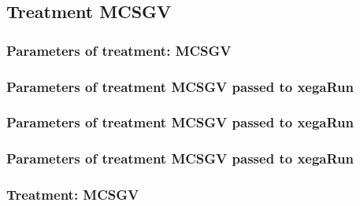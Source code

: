\documentclass[18pt,c]{beamer}
\makeatletter
\def\beamer@writeslidentry@miniframesoff{%
  \expandafter\beamer@ifempty\expandafter{\beamer@framestartpage}{}%
  {%
   \clearpage\beamer@notesactions%
  }
}
\newcommand*{\miniframesoff}{\let\beamer@writeslidentry=\beamer@writeslidentry@miniframesoff}
\makeatother
\begin{document}
\miniframesoff
\subsection{Treatment MCSGV}

 \begin{frame}
 \fontsize{8pt}{9pt}\selectfont
 \frametitle{  Parameters of treatment: MCSGV 
 }

 \label{ExpAtParmTable008.tex}  
 \end{frame}


 \begin{frame}
 \fontsize{8pt}{9pt}\selectfont
 \frametitle{  Parameters of treatment MCSGV passed to xegaRun
 }

 \label{ExpAtParmTable009.tex}  
 \end{frame}


 \begin{frame}
 \fontsize{8pt}{9pt}\selectfont
 \frametitle{  Parameters of treatment MCSGV passed to xegaRun
 }

 \label{ExpAtParmTable010.tex}  
 \end{frame}


 \begin{frame}
 \fontsize{8pt}{9pt}\selectfont
 \frametitle{  Parameters of treatment MCSGV passed to xegaRun
 }

 \label{ExpAtParmTable011.tex}  
 \end{frame}

 \begin{frame}
 \fontsize{8pt}{9pt}\selectfont
 \frametitle{ Treatment: MCSGV }

 \label{ExpAStatsTable017.tex}  
 \end{frame}
\end{document}

